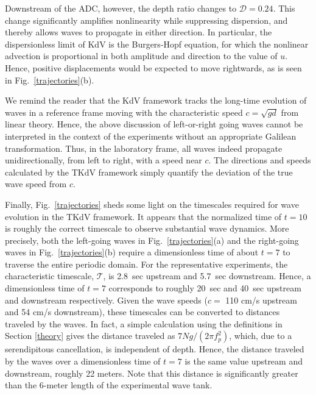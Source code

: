 \documentclass[11pt]{article}
\newcommand{\freqp}{f_p}
\newcommand{\depth}{d}
\newcommand{\lamfac}{N}
\newcommand{\drat}{\mathcal{D}}
\newcommand{\timescale}{\mathcal{T}}
\begin{document}
	Downstream of the ADC, however, the depth ratio changes to $\drat = 0.24$. This change significantly amplifies nonlinearity while suppressing dispersion, and thereby allows waves to propagate in either direction. In particular, the dispersionless limit of KdV is the Burgers-Hopf equation, for which the nonlinear advection is proportional in both amplitude and direction to the value of $u$. Hence, positive displacements would be expected to move rightwards, as is seen in Fig.~\ref{trajectories}(b).

	We remind the reader that the KdV framework tracks the long-time evolution of waves in a reference frame moving with the characteristic speed $c = \sqrt{g \depth}$ from linear theory. Hence, the above discussion of left-or-right going waves cannot be interpreted in the context of the experiments without an appropriate Galilean transformation. Thus, in the laboratory frame, all waves indeed propagate unidirectionally, from left to right, with a speed near $c$. The directions and speeds calculated by the TKdV framework simply quantify the deviation of the true wave speed from $c$.
		
	Finally, Fig.~\ref{trajectories} sheds some light on the timescales required for wave evolution in the TKdV framework. It appears that the normalized time of $t=10$ is roughly the correct timescale to observe substantial wave dynamics. More precisely, both the left-going waves in Fig.~\ref{trajectories}(a) and the right-going waves in Fig.~\ref{trajectories}(b) require a dimensionless time of about $t=7$ to traverse the entire periodic domain. For the representative experiments, the characteristic timescale, $\timescale$, is 2.8~sec upstream and 5.7~sec downstream. Hence, a dimensionless time of $t=7$ corresponds to roughly 20~sec and 40~sec upstream and downstream respectively. Given the wave speeds ($c = $ 110 cm/s upstream and 54 cm/s downstream), these timescales can be converted to distances traveled by the waves. In fact, a simple calculation using the definitions in Section \ref{theory} gives the distance traveled as $7 \lamfac g/(2 \pi \freqp^2)$, which, due to a serendipitous cancellation, is independent of depth. Hence, the distance traveled by the waves over a dimensionless time of $t=7$ is the same value upstream and downstream,  roughly 22 meters. Note that this distance is significantly greater than the 6-meter length of the experimental wave tank.
\end{document}
